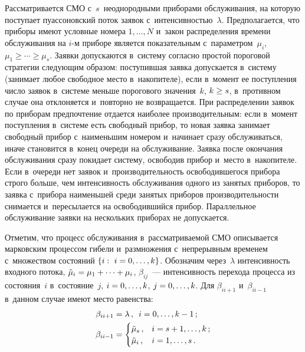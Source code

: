 \begin{multicols}{2}
Рассматривается СМО с~$s$~неоднородными приборами обслуживания, на
которую поступает пуассоновский поток заявок с~интенсивностью~$\lambda$.
Предполагается, что приборы имеют условные номера $1,\ldots , N$
и~закон распределения времени обслуживания на $i$-м приборе является
показательным с~параметром~$\mu_i$, $\mu_1\geq \cdots \geq \mu_s$. Заявки
допускаются в~систему согласно простой пороговой стратегии следующим
образом: поступившая заявка допускается в~систему (занимает любое
свободное место в~накопителе), если в~момент ее поступления число заявок
в~сис\-те\-ме меньше порогового значения~$k$, $k\hm\geq s$, в~противном случае
она отклоняется и~повторно не возвращается. При распределении заявок по
приборам предпочтение отдается наиболее производительным: если в~момент
поступления в~сис\-те\-ме есть свободный прибор, то новая заявка занимает
свободный прибор с~наименьшим номером и~начинает сразу обслуживаться,
иначе становится в~конец очереди на обслуживание. Заявка после окончания
обслуживания сразу покидает систему, освободив прибор и~место
в~накопителе. Если в~очереди нет заявок и~производительность
освободившегося прибора строго больше, чем интенсивность обслуживания
одного из занятых приборов, то заявка с~прибора наименьшей среди занятых
приборов производительности снимается и~пересылается на освободившийся
прибор. Параллельное обслуживание заявки на нескольких приборах не
допускается.

Отметим, что процесс обслуживания в~рас\-смат\-ри\-ва\-емой СМО описывается
марковским процессом гибели и~размножения с~непрерывным временем
с~множеством состояний $\{i:\ i\hm=0,\ldots , k\}$. Обозначим через~$\lambda$
интенсивность входного потока, $\tilde{\mu}_i\hm= \mu_1+\cdots + \mu_i$,
$\beta_{ij}$~--- интенсивность перехода процесса из состояния~$i$
в~состояние~$j$, $i\hm=0,\ldots , k$, $j\hm=0,\ldots , k$. Для $\beta_{ii+1}$
и~$\beta_{ii-1}$ в~данном случае имеют место равенства:
\begin{align*}
\beta_{ii+1} &=\lambda\,, \enskip i=0,\ldots , k-1\,;\\
\beta_{ii-1} &=\begin{cases}
\tilde{\mu}_s\,, & i=s+1,\ldots , k\,;\\
\tilde{\mu}_i\,, & i=1,\ldots , s\,.
\end{cases}
\end{align*}


\end{multicols}
